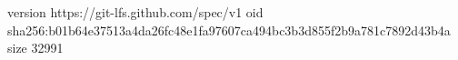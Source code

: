 version https://git-lfs.github.com/spec/v1
oid sha256:b01b64e37513a4da26fc48e1fa97607ca494bc3b3d855f2b9a781c7892d43b4a
size 32991
